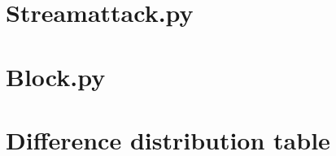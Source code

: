 \documentclass[british,11pt,a4paper]{article}
\begin{document}
\begin{appendices}
  \section{Streamattack.py}\label{app:streamattack}
  
  \clearpage

  \section{Block.py}\label{app:block}
  

	\section{Difference distribution table}\label{app:diff_distrib_tab}
  \clearpage

\end{appendices}
\end{document}
